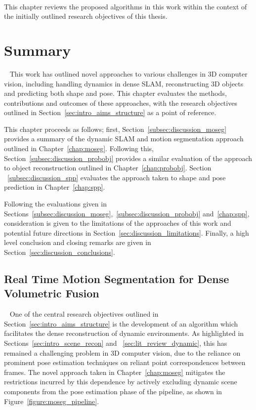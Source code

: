 ~\label{chap:discussion}
\begin{chapterabstract}
This chapter reviews the proposed algorithms in this work within the context 
of the initially outlined research objectives of this thesis.
\end{chapterabstract}

\section{Summary}
~\label{sec:discussion_summary}
This work has outlined novel approaches to various challenges in 3D computer vision, 
including handling dynamics in dense SLAM, reconstructing 3D objects and predicting both 
shape and pose. This chapter evaluates the methods, contributions and outcomes of these 
approaches, with the research objectives outlined in Section~\ref{sec:intro_aims_structure} 
as a point of reference.

This chapter proceeds as follows; first, Section~\ref{subsec:discussion_moseg} provides a 
summary of the dynamic SLAM and motion segmentation approach outlined in Chapter~\ref{chap:moseg}.
Following this, Section~\ref{subsec:discussion_probobj} provides a similar evaluation of the 
approach to object reconstruction outlined in Chapter~\ref{chap:probobj}. Section
~\ref{subsec:discussion_spp} evaluates the approach taken to shape and pose prediction in 
Chapter~\ref{chap:spp}.

Following the evaluations given in Sections~\ref{subsec:discussion_moseg},~\ref{subsec:discussion_probobj} 
and~\ref{chap:spp}, consideration is given to the limitations of the approaches of this work and potential 
future directions in Section~\ref{sec:discussion_limitations}. Finally, a high level conclusion and closing 
remarks are given in Section~\ref{sec:discussion_conclusions}.

\subsection{Real Time Motion Segmentation for Dense Volumetric Fusion}
~\label{subsec:discussion_moseg}
One of the central research objectives outlined in Section~\ref{sec:intro_aims_structure} 
is the development of an algorithm which facilitates the dense reconstruction of dynamic 
environments. As highlighted in Sections~\ref{sec:intro_scene_recon} and
~\ref{sec:lit_review_dynamic}, this has remained a challenging problem in 3D computer vision, 
due to the reliance on prominent pose estimation techniques on reliant point correspondences 
between frames. The novel approach taken in Chapter~\ref{chap:moseg} mitigates the restrictions 
incurred by this dependence by actively excluding dynamic scene components from the pose 
estimation phase of the pipeline, as shown in Figure~\ref{figure:moseg_pipeline}.


